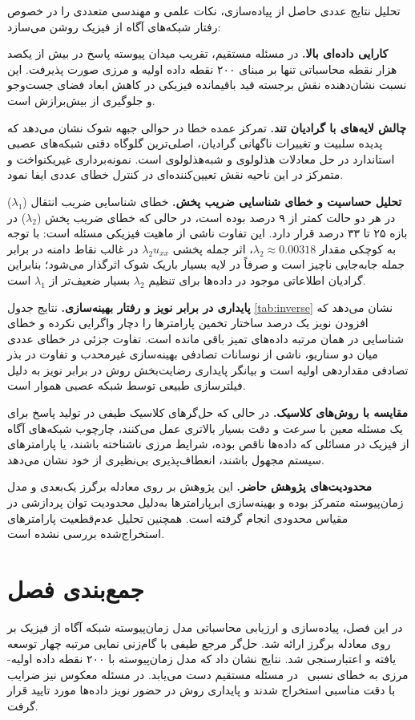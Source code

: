 تحلیل نتایج عددی حاصل از پیاده‌سازی، نکات علمی و مهندسی متعددی را در خصوص رفتار شبکه‌های آگاه از فیزیک روشن می‌سازد:

\textbf{کارایی داده‌ای بالا.} در مسئله مستقیم، تقریب میدان پیوسته پاسخ در بیش از یکصد هزار نقطه محاسباتی تنها بر مبنای ۲۰۰ نقطه داده اولیه و مرزی صورت پذیرفت. این نسبت نشان‌دهنده نقش برجسته قید باقیمانده فیزیکی در کاهش ابعاد فضای جست‌وجو و جلوگیری از بیش‌برازش است.

\textbf{چالش لایه‌های با گرادیان تند.} تمرکز عمده خطا در حوالی جبهه شوک نشان می‌دهد که پدیده سلبیت و تغییرات ناگهانی گرادیان، اصلی‌ترین گلوگاه دقتی شبکه‌های عصبی استاندارد در حل معادلات هذلولوی و شبه‌هذلولوی است. نمونه‌برداری غیریکنواخت و متمرکز در این ناحیه نقش تعیین‌کننده‌ای در کنترل خطای عددی ایفا نمود.

\textbf{تحلیل حساسیت و خطای شناسایی ضریب پخش.} خطای شناسایی ضریب انتقال ($\lambda_1$) در هر دو حالت کمتر از ۹ درصد بوده است، در حالی که خطای ضریب پخش ($\lambda_2$) در بازه ۲۵ تا ۳۳ درصد قرار دارد. این تفاوت ناشی از ماهیت فیزیکی مسئله است: با توجه به کوچکی مقدار $\lambda_2 \approx 0.00318$، اثر جمله پخشی $\lambda_2 u_{xx}$ در غالب نقاط دامنه در برابر جمله جابه‌جایی ناچیز است و صرفاً در لایه بسیار باریک شوک اثرگذار می‌شود؛ بنابراین گرادیان اطلاعاتی موجود در داده‌ها برای تنظیم $\lambda_2$ بسیار ضعیف‌تر از $\lambda_1$ است.

\textbf{پایداری در برابر نویز و رفتار بهینه‌سازی.} نتایج جدول \ref{tab:inverse} نشان می‌دهد که افزودن نویز یک درصد ساختار تخمین پارامترها را دچار واگرایی نکرده و خطای شناسایی در همان مرتبه داده‌های تمیز باقی مانده است. تفاوت جزئی در خطای عددی میان دو سناریو، ناشی از نوسانات تصادفی بهینه‌سازی غیرمحدب و تفاوت در بذر تصادفی مقداردهی اولیه است و بیانگر پایداری رضایت‌بخش روش در برابر نویز به دلیل فیلترسازی طبیعی توسط شبکه عصبی هموار است.

\textbf{مقایسه با روش‌های کلاسیک.} در حالی که حل‌گرهای کلاسیک طیفی در تولید پاسخ برای یک مسئله معین با سرعت و دقت بسیار بالاتری عمل می‌کنند، چارچوب شبکه‌های آگاه از فیزیک در مسائلی که داده‌ها ناقص بوده، شرایط مرزی ناشناخته باشند، یا پارامترهای سیستم مجهول باشند، انعطاف‌پذیری بی‌نظیری از خود نشان می‌دهد.

\textbf{محدودیت‌های پژوهش حاضر.} این پژوهش بر روی معادله برگرز یک‌بعدی و مدل زمان‌پیوسته متمرکز بوده و بهینه‌سازی ابرپارامترها به‌دلیل محدودیت توان پردازشی در مقیاس محدودی انجام گرفته است. همچنین تحلیل عدم‌قطعیت پارامترهای استخراج‌شده بررسی نشده است.

\section{جمع‌بندی فصل}
\label{sec:ch4-summary}

در این فصل، پیاده‌سازی و ارزیابی محاسباتی مدل زمان‌پیوسته شبکه آگاه از فیزیک بر روی معادله برگرز ارائه شد. حل‌گر مرجع طیفی با گام‌زنی نمایی مرتبه چهار توسعه یافته و اعتبارسنجی شد. نتایج نشان داد که مدل زمان‌پیوسته با ۲۰۰ نقطه داده اولیه-مرزی به خطای نسبی \FwdRelErr\ در مسئله مستقیم دست می‌یابد. در مسئله معکوس نیز ضرایب با دقت مناسبی استخراج شدند و پایداری روش در حضور نویز داده‌ها مورد تایید قرار گرفت.

